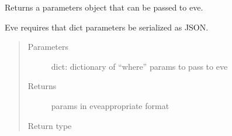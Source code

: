 \documentclass[letterpaper,10pt,english]{sphinxmanual}
\begin{document}
\begin{fulllineitems}
\label{\detokenize{autoapi/pine/backend/data/service/index:pine.backend.data.service.params}}
\sphinxAtStartPar
Returns a parameters object that can be passed to eve.

\sphinxAtStartPar
Eve requires that dict parameters be serialized as JSON.
\begin{quote}\begin{description}
\item[{Parameters}] \leavevmode
\sphinxAtStartPar
{} \textendash{} dict: dictionary of “where” params to pass to eve

\item[{Returns}] \leavevmode
\sphinxAtStartPar
params in eve\sphinxhyphen{}appropriate format

\item[{Return type}] \leavevmode
\sphinxAtStartPar
{}

\end{description}\end{quote}

\end{fulllineitems}

\end{document}

